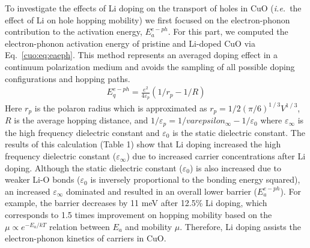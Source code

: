 To investigate the effects of Li doping on the transport of holes in CuO (\textit{i.e.}\ the effect of Li on hole hopping mobility) we first focused on the electron-phonon contribution to the activation energy, $E_a^{e-ph}$. For this part, we computed the electron-phonon activation energy of pristine and Li-doped CuO via Eq.~\ref{cuo:eq:eaeph}. This method represents an averaged doping effect in a continuum polarization medium and avoids the sampling of all possible doping configurations and hopping paths.~\cite{austin1969polarons}
\begin{align}
    E_q^{e-ph} = \frac{e^2}{4\varepsilon_p} \left( 1/r_p - 1/R \right)
    \label{cuo:eq:cfe}
\end{align}
Here $r_p$ is the polaron radius which is approximated as $r_p=1/2 (\pi/6)^{1⁄3} V^{1⁄3}$, $R$ is the average hopping distance, and $1/\varepsilon_p =1/varepsilon_\infty -1/\varepsilon_0$ where $\varepsilon_\infty$ is the high frequency dielectric constant and $\varepsilon_0$ is the static dielectric constant. The results of this calculation (Table 1) show that Li doping increased the high frequency dielectric constant ($\varepsilon_\infty$) due to increased carrier concentrations after Li doping. Although the static dielectric constant ($\varepsilon_0$) is also increased due to weaker Li-O bonds ($\varepsilon_0$ is inversely proportional to the bonding energy squared)\cite{gonze1997dynamical}, an increased $\varepsilon_\infty$ dominated and resulted in an overall lower barrier ($E_a^{e-ph}$). For example, the barrier decreases by 11 meV after 12.5\% Li doping, which corresponds to 1.5 times improvement on hopping mobility based on the $\mu \propto e^{-E_a/kT}$ relation between $E_a$ and mobility $\mu$. Therefore, Li doping assists the electron-phonon kinetics of carriers in CuO.

